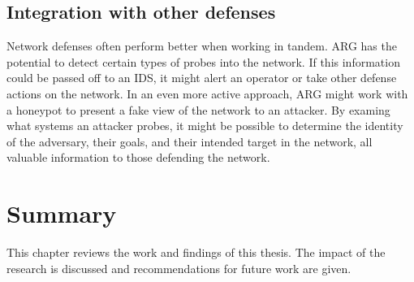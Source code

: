 \subsection{Integration with other defenses}
\par Network defenses often perform better when working in tandem. \ac{ARG} has the potential to detect certain types of probes into the network. If this information could be passed off to an \ac{IDS}, it might alert an operator or take other defense actions on the network. In an even more active approach, \ac{ARG} might work with a honeypot to present a fake view of the network to an attacker. By examing what systems an attacker probes, it might be possible to determine the identity of the adversary, their goals, and their intended target in the network, all valuable information to those defending the network.

\section{Summary}
\par This chapter reviews the work and findings of this thesis. The impact of the research is discussed and recommendations for future work are given.

